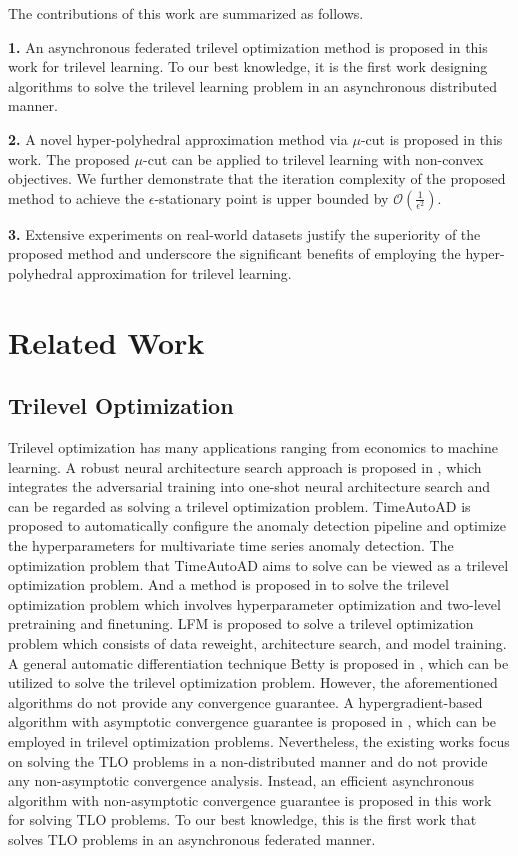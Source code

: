 \documentclass[letterpaper]{article}
\begin{document}
The contributions of this work are summarized as follows.

\textbf{1.} An asynchronous federated trilevel optimization method is proposed in this work for trilevel learning. To our best knowledge, it is the first work designing algorithms to solve the trilevel learning problem in an asynchronous distributed manner.


\textbf{2.} A novel hyper-polyhedral approximation method via  $\mu$-cut is proposed in this work. The proposed $\mu$-cut can be applied to trilevel learning with non-convex objectives. We further demonstrate that the iteration complexity of the proposed method to achieve the $\epsilon$-stationary point is upper bounded by $\mathcal{O}(\frac{1}{\epsilon^2})$.


\textbf{3.} Extensive experiments on real-world datasets justify the superiority of the proposed method and underscore the significant benefits of employing the hyper-polyhedral approximation for trilevel learning.

\section{Related Work}
\subsection{Trilevel Optimization}
Trilevel optimization has many applications ranging from economics to machine learning. A robust neural architecture search approach is proposed in \cite{guo2020meets}, which integrates the adversarial training into one-shot neural architecture search and can be regarded as solving a trilevel optimization problem. TimeAutoAD \cite{jiao2022timeautoad} is proposed to automatically configure the anomaly detection pipeline and optimize the hyperparameters for multivariate time series anomaly detection. The optimization problem that TimeAutoAD aims to solve can be viewed as a trilevel optimization problem. And a method is proposed in \cite{raghu2021meta} to solve the trilevel optimization problem which involves hyperparameter optimization and two-level pretraining and finetuning. LFM \cite{garg2022learning} is proposed to solve a trilevel optimization problem which consists of data reweight, architecture search, and model training. A general automatic differentiation technique Betty is proposed in \cite{choe2022betty}, which can be utilized to solve the trilevel optimization problem. However, the aforementioned algorithms do not provide any convergence guarantee. A hypergradient-based algorithm with asymptotic convergence guarantee is proposed in \cite{sato2021gradient}, which can be employed in trilevel optimization problems. Nevertheless, the existing works focus on solving the TLO problems in a non-distributed manner and do not provide any non-asymptotic convergence analysis. Instead, an efficient asynchronous algorithm with non-asymptotic convergence guarantee is proposed in this work for solving TLO problems. To our best knowledge, this is the first work that solves TLO problems in an asynchronous federated manner.
\end{document}
